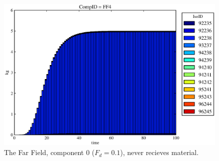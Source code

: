 \begin{figure}[ht]
\begin{minipage}[b]{0.45\linewidth}
  \includegraphics[width=\textwidth]{./chapters/demonstration/base/mcIII0.eps}
  \caption[Case MCI Waste Package Contaminants.]{ 
    The Far Field, component 0 ($F_d = 0.1$), never recieves material.
    }
  \label{fig:mcIIIff0}


  \end{minipage}
\end{figure}



